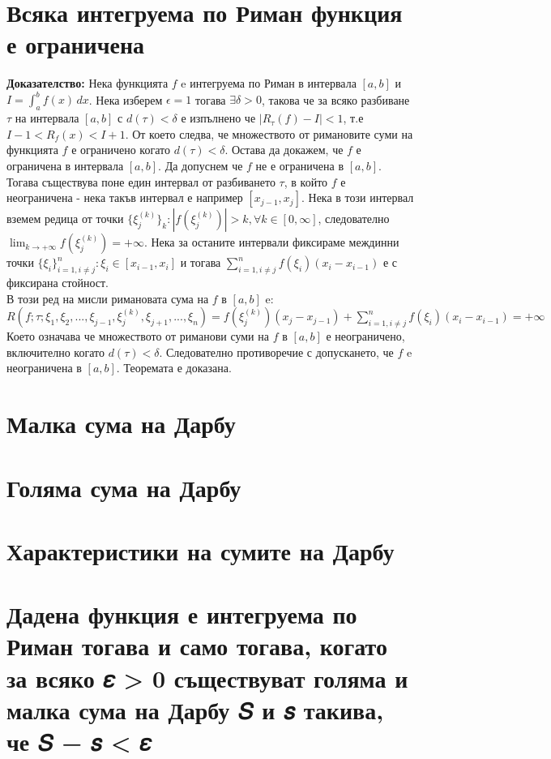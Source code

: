\documentclass[fleqn,12pt]{article}
\begin{document}
\begin{flushleft}
\section{Всяка интегруема по Риман функция е ограничена}
\textbf{Доказателство: } Нека функцията $f$ e интегруема по Риман в интервала $[a,b]$ и $I = \int_{a}^{b}  f(x)\,dx$. Нека изберем $\epsilon=1$ тогава $\exists \delta>0$, такова че 
за всяко разбиване $\tau$ на интервала $[a,b]$ с $d(\tau)<\delta$ е изпълнено че $|R_\tau(f) - I|<1$, т.е $I-1<R_f(x)<I+1$. От което следва, че множеството от римановите суми на функцията
$f$ е ограничено когато $d(\tau)<\delta$. Остава да докажем, че $f$ е ограничена в интервала $[a,b]$.
Да допуснем че $f$ не е ограничена в $[a,b]$. Тогава съществува поне един интервал от разбиването $\tau$, в който $f$ е неограничена - нека такъв интервал е например $[x_{j-1},x_j]$.
Нека в този интервал вземем редица от точки $\{\xi_j^{(k)}\}_k : |f(\xi_j^{(k)})| > k, \forall k \in [0,\infty]$, следователно $\lim_{k \rightarrow +\infty} f(\xi_j^{(k)}) = +\infty$.
Нека за останите интервали фиксираме междинни точки $\{\xi_i\}_{i=1,i \neq j}^n : \xi_i \in [x_{i-1},x_i]$ и тогава $\sum_{i=1,i \neq j}^{n} f(\xi_i)(x_i - x_{i-1})$ е с фиксирана стойност.\\
В този ред на мисли римановата сума на $f$ в $[a,b]$ e: \\
$R(f;\tau;\xi_1,\xi_2, ... ,\xi_{j-1},\xi_j^{(k)},\xi_{j+1}, ... ,\xi_n) = f(\xi_j^{(k)})(x_j - x_{j-1}) + \sum_{i=1,i \neq j}^{n} f(\xi_i)(x_i - x_{i-1}) = +\infty$ \\
Което означава че множеството от риманови суми на $f$ в $[a,b]$ е неограничено, включително когато $d(\tau)<\delta$. Следователно противоречие с допускането, че $f$ e неограничена в $[a,b]$.
Теоремата е доказана. 

\section{Малка сума на Дарбу}
\section{Голяма сума на Дарбу}
\section{Характеристики на сумите на Дарбу}
\section{Дадена функция е интегруема по Риман тогава и само тогава, когато за всяко 𝜀 > 0 съществуват голяма и малка сума на Дарбу 𝑆 и 𝑠 такива, че 𝑆 − 𝑠 < 𝜀}

\end{flushleft}
\end{document}
